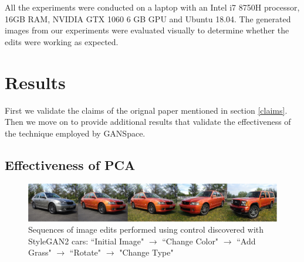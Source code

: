 \documentclass{article}
\begin{document}
All the experiments were conducted on a laptop with an Intel i7 8750H processor, 16GB RAM, NVIDIA GTX 1060 6 GB GPU and Ubuntu 18.04. The generated images from our experiments were evaluated visually to determine whether the edits were working as expected.




\section{Results}

First we validate the claims of the orignal paper mentioned in section \ref{claims}. Then we move on to provide additional results that validate the effectiveness of the technique employed by GANSpace.



\subsection{Effectiveness of PCA}

\begin{figure}[H]
    \centering
    \includegraphics[width=\textwidth]{figs/figure1_StyleGAN2_cars.png}
    \caption{Sequences of image edits performed using control discovered with StyleGAN2 cars: ``Initial Image" $\rightarrow$ ``Change Color" $\rightarrow$ ``Add Grass" $\rightarrow$ ``Rotate" $\rightarrow$ "Change Type"}
    \label{fig:cars}
\end{figure}
\end{document}
